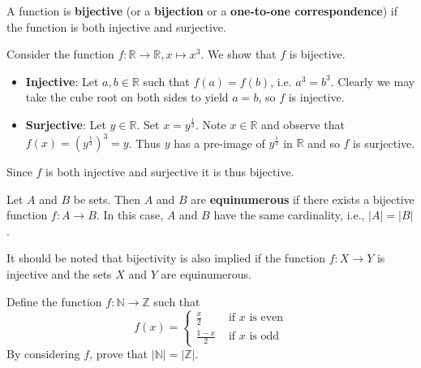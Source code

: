 \begin{definition}
    A function is \textbf{bijective} (or a \textbf{bijection} or a \textbf{one-to-one correspondence}) if the function is both injective and surjective.
\end{definition}
\begin{example}
    Consider the function $f: \mathbb{R} \to \mathbb{R}, x \mapsto x^3$. We show that $f$ is bijective.
    \begin{itemize}
        \item \textbf{Injective}: Let $a, b \in \mathbb{R}$ such that $f(a) = f(b)$, i.e. $a^3 = b^3$. Clearly we may take the cube root on both sides to yield $a = b$, so $f$ is injective.
        \item \textbf{Surjective}: Let $y \in \mathbb{R}$. Set $x=y^{\frac13}$. Note $x \in \mathbb{R}$ and observe that $f(x) = \left(y^{\frac13}\right)^3 = y$. Thus $y$ has a pre-image of $y^{\frac13}$ in $\mathbb{R}$ and so $f$ is surjective.
    \end{itemize}
    Since $f$ is both injective and surjective it is thus bijective.
\end{example}

\begin{definition}
    Let $A$ and $B$ be sets. Then $A$ and $B$ are \textbf{equinumerous} if there exists a bijective function $f: A \to B$. In this case, $A$ and $B$ have the same cardinality, i.e., $|A| = |B|$.
\end{definition}
\begin{remark}
    It should be noted that bijectivity is also implied if the function $f: X \to Y$ is injective and the sets $X$ and $Y$ are equinumerous.
\end{remark}

\begin{exercise}
    Define the function $f: \mathbb{N} \to \mathbb{Z}$ such that
    \[
        f(x) = \begin{cases}
            \frac{x}{2} & \text{ if } x \text{ is even}\\
            \frac{1-x}{2} & \text{ if } x \text{ is odd} 
        \end{cases}
    \]
    By considering $f$, prove that $|\mathbb{N}| = |\mathbb{Z}|$.
\end{exercise}
